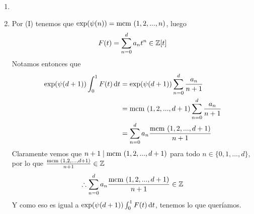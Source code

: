 \begin{sol}
	\begin{enumerate}[label = \roman*]
		\item

		\item Por (I) tenemos que $\exp(\psi(n))=\text{mcm }(1,2,...,n)$, luego
		      \[F(t)=\sum_{n=0}^da_nt^n\in\mathbb{Z}[t]\]
		      Notamos entonces que
		      \begin{align*}
			      \exp(\psi(d+1))\int_0^1 F(t)\operatorname{d}\!{t} & =\exp(\psi(d+1))\sum_{n=0}^d\frac{a_n}{n+1}   \\
			                                        & =\text{mcm }(1,2,...,d+1)\sum_{n=0}^d\frac{a_n}{n+1} \\
			                                        & =\sum_{n=0}^da_n\frac{\text{mcm }(1,2,...,d+1)}{n+1}
		      \end{align*}
		      Claramente vemos que $n+1\mid\text{mcm }(1,2,...,d+1)$ para todo $n\in\{0,1,...,d\}$, por lo que $\frac{\text{mcm }(1,2,...,d+1)}{n+1}\in\mathbb{Z}$
		      \begin{equation*}
			      \therefore \sum_{n=0}^da_n\frac{\text{mcm }(1,2,...,d+1)}{n+1}\in\mathbb{Z}\label{eq:ii}
		      \end{equation*}
		      Y como eso es igual a $\exp(\psi(d+1))\int_0^1F(t)\operatorname{d}\!{t}$, tenemos lo que queríamos.


\end{enumerate}
\end{sol}
